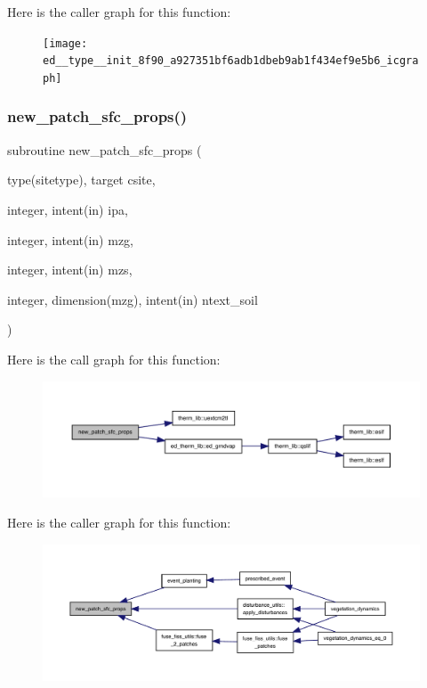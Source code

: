 Here is the caller graph for this function\+:
\nopagebreak
\begin{figure}[H]
\begin{center}
\leavevmode
\texttt{[image: ed\_\_type\_\_init\_8f90\_a927351bf6adb1dbeb9ab1f434ef9e5b6\_icgraph]}
\end{center}
\end{figure}
\mbox{\label{ed__type__init_8f90_aa6a689a6e6981ff6c33afcb419db9b28}} 
\subsubsection{\texorpdfstring{new\+\_\+patch\+\_\+sfc\+\_\+props()}{new\_patch\_sfc\_props()}}
{\footnotesize\ttfamily subroutine new\+\_\+patch\+\_\+sfc\+\_\+props (\begin{DoxyParamCaption}\item[{type(sitetype), target}]{csite,  }\item[{integer, intent(in)}]{ipa,  }\item[{integer, intent(in)}]{mzg,  }\item[{integer, intent(in)}]{mzs,  }\item[{integer, dimension(mzg), intent(in)}]{ntext\+\_\+soil }\end{DoxyParamCaption})}

Here is the call graph for this function\+:
\nopagebreak
\begin{figure}[H]
\begin{center}
\leavevmode
\includegraphics[width=350pt]{ed__type__init_8f90_aa6a689a6e6981ff6c33afcb419db9b28_cgraph}
\end{center}
\end{figure}
Here is the caller graph for this function\+:
\nopagebreak
\begin{figure}[H]
\begin{center}
\leavevmode
\includegraphics[width=350pt]{ed__type__init_8f90_aa6a689a6e6981ff6c33afcb419db9b28_icgraph}
\end{center}
\end{figure}
